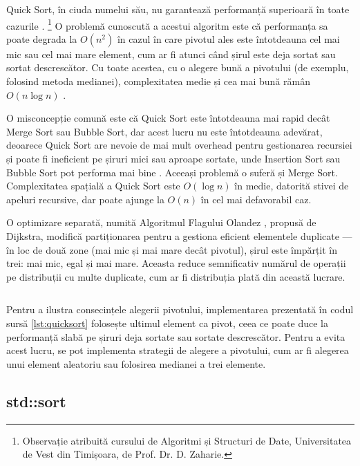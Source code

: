 \documentclass[9pt,a4paper,twocolumn,twoside]{rho-class/rho}
\begin{document}
Quick Sort, în ciuda numelui său, nu garantează performanță 
superioară în toate cazurile \cite{hoare1961quicksort, knuth1998sorting}.
\footnote{Observație atribuită cursului de Algoritmi și Structuri 
de Date, Universitatea de Vest din Timișoara, de Prof. Dr. D. Zaharie.}
O problemă cunoscută a acestui algoritm este că performanța sa poate degrada la $O(n^2)$ în cazul în care pivotul ales este întotdeauna cel mai mic sau cel mai mare element, cum ar fi atunci când șirul este deja sortat sau sortat descrescător. Cu toate acestea, cu o alegere bună a pivotului (de exemplu, folosind metoda medianei), complexitatea medie și cea mai bună rămân $O(n \log n)$ \cite{knuth1998sorting}.
\par O misconcepție comună este că Quick Sort este întotdeauna mai rapid decât Merge Sort sau Bubble Sort, dar acest lucru nu este întotdeauna adevărat, deoarece Quick Sort are nevoie de mai mult overhead pentru gestionarea recursiei și poate fi ineficient pe șiruri mici sau aproape sortate, unde Insertion Sort sau Bubble Sort pot performa mai bine \cite{knuth1998sorting}. Aceeași problemă o suferă și Merge Sort.
Complexitatea spațială a Quick Sort este $O(\log n)$ în medie, datorită stivei de apeluri recursive, dar poate ajunge la $O(n)$ în cel mai defavorabil caz.

O optimizare separată, numită Algoritmul Flagului Olandez 
\cite{dijkstra1976discipline}, propusă de Dijkstra, modifică 
partiționarea pentru a gestiona eficient elementele duplicate — 
în loc de două zone (mai mic și mai mare decât pivotul), șirul 
este împărțit în trei: mai mic, egal și mai mare. Aceasta reduce 
semnificativ numărul de operații pe distribuții cu multe duplicate, 
cum ar fi distribuția plată din această lucrare.


\begin{code}
    \inputminted[style=friendly]{cpp}{cod_sursa/quicksort.cpp}
    \caption{Implementarea Quick Sort în C++.}
    \label{lst:quicksort}
\end{code}

Pentru a ilustra consecințele alegerii pivotului, implementarea prezentată în codul sursă \ref{lst:quicksort} folosește ultimul element ca pivot, ceea ce poate duce la performanță slabă pe șiruri deja sortate sau sortate descrescător. Pentru a evita acest lucru, se pot implementa strategii de alegere a pivotului, cum ar fi alegerea unui element aleatoriu sau folosirea medianei a trei elemente.

\subsection{std::sort}
\end{document}
